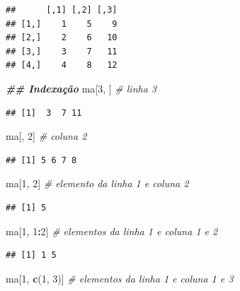 \documentclass[
]{article}
\newenvironment{Shaded}{\begin{snugshade}}{\end{snugshade}}
\newcommand{\CommentTok}[1]{\textcolor[rgb]{0.56,0.35,0.01}{\textit{#1}}}
\newcommand{\DecValTok}[1]{\textcolor[rgb]{0.00,0.00,0.81}{#1}}
\newcommand{\DocumentationTok}[1]{\textcolor[rgb]{0.56,0.35,0.01}{\textbf{\textit{#1}}}}
\newcommand{\FunctionTok}[1]{\textcolor[rgb]{0.13,0.29,0.53}{\textbf{#1}}}
\newcommand{\NormalTok}[1]{#1}
\newcommand{\SpecialCharTok}[1]{\textcolor[rgb]{0.81,0.36,0.00}{\textbf{#1}}}
\begin{document}
\begin{verbatim}
##      [,1] [,2] [,3]
## [1,]    1    5    9
## [2,]    2    6   10
## [3,]    3    7   11
## [4,]    4    8   12
\end{verbatim}

\begin{Shaded}
\begin{Highlighting}[]
\DocumentationTok{\#\# Indexação}
\NormalTok{ma[}\DecValTok{3}\NormalTok{, ] }\CommentTok{\# linha 3}
\end{Highlighting}
\end{Shaded}

\begin{verbatim}
## [1]  3  7 11
\end{verbatim}

\begin{Shaded}
\begin{Highlighting}[]
\NormalTok{ma[, }\DecValTok{2}\NormalTok{] }\CommentTok{\# coluna 2}
\end{Highlighting}
\end{Shaded}

\begin{verbatim}
## [1] 5 6 7 8
\end{verbatim}

\begin{Shaded}
\begin{Highlighting}[]
\NormalTok{ma[}\DecValTok{1}\NormalTok{, }\DecValTok{2}\NormalTok{] }\CommentTok{\# elemento da linha 1 e coluna 2}
\end{Highlighting}
\end{Shaded}

\begin{verbatim}
## [1] 5
\end{verbatim}

\begin{Shaded}
\begin{Highlighting}[]
\NormalTok{ma[}\DecValTok{1}\NormalTok{, }\DecValTok{1}\SpecialCharTok{:}\DecValTok{2}\NormalTok{] }\CommentTok{\# elementos da linha 1 e coluna 1 e 2}
\end{Highlighting}
\end{Shaded}

\begin{verbatim}
## [1] 1 5
\end{verbatim}

\begin{Shaded}
\begin{Highlighting}[]
\NormalTok{ma[}\DecValTok{1}\NormalTok{, }\FunctionTok{c}\NormalTok{(}\DecValTok{1}\NormalTok{, }\DecValTok{3}\NormalTok{)] }\CommentTok{\# elementos da linha 1 e coluna 1 e 3}
\end{Highlighting}
\end{Shaded}
\end{document}
